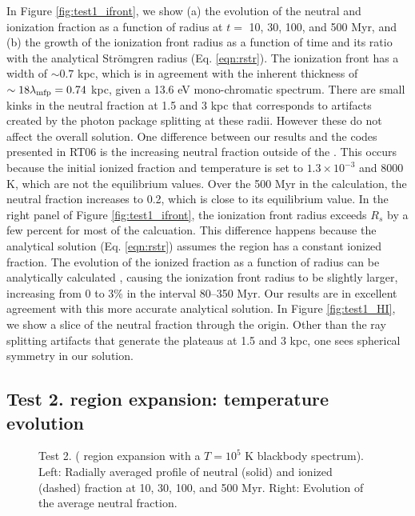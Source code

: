 \documentclass[12pt,preprint]{aastex}
\begin{document}
In Figure \ref{fig:test1_ifront}, we show (a) the evolution of the
neutral and ionization fraction as a function of radius at $t = $ 10,
30, 100, and 500 Myr, and (b) the growth of the ionization front
radius as a function of time and its ratio with the analytical
Str\"{o}mgren radius (Eq. \ref{eqn:rstr}).  The ionization front has a
width of $\sim0.7$ kpc, which is in agreement with the inherent
thickness of $\sim18 \lambda_{\rm mfp} = 0.74$ kpc, given a 13.6 eV
mono-chromatic spectrum.  There are small kinks in the neutral
fraction at 1.5 and 3 kpc that corresponds to artifacts created by the
photon package splitting at these radii.  However these do not affect
the overall solution.  One difference between our results and the
codes presented in RT06 is the increasing neutral fraction outside of
the .  This occurs because the initial ionized fraction and
temperature is set to $1.3 \times 10^{-3}$ and 8000 K, which are not
the equilibrium values.  Over the 500 Myr in the calculation, the
neutral fraction increases to 0.2, which is close to its equilibrium
value.  In the right panel of Figure \ref{fig:test1_ifront}, the
ionization front radius exceeds $R_s$ by a few percent for most of the
calcuation.  This difference happens because the analytical solution
(Eq. \ref{eqn:rstr}) assumes the  region has a constant
ionized fraction.  The evolution of the ionized fraction as a function
of radius can be analytically calculated \citep[e.g.][]{Osterbrock89,
  Petkova09}, causing the ionization front radius to be slightly
larger, increasing from 0 to 3\% in the interval 80--350 Myr.  Our
results are in excellent agreement with this more accurate analytical
solution.  In Figure \ref{fig:test1_HI}, we show a slice of the
neutral fraction through the origin.  Other than the ray splitting
artifacts that generate the plateaus at 1.5 and 3 kpc, one sees
spherical symmetry in our solution.

\subsection{Test 2.  region expansion: temperature evolution}

\begin{figure}[t]
  \caption{\label{fig:test2_1} Test 2. ( region
    expansion with a $T=10^5$ K blackbody spectrum).  Left:
    Radially averaged profile of neutral (solid) and ionized (dashed)
    fraction at 10, 30, 100, and 500 Myr.  Right: Evolution of the
    average neutral fraction.}
\end{figure}
\end{document}
